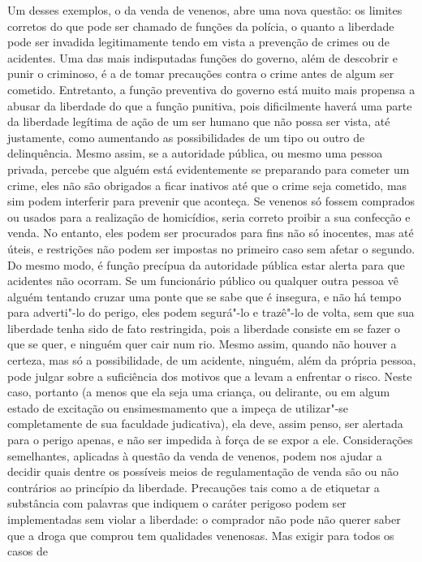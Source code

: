  Um desses exemplos, o da venda de venenos, abre uma nova questão: os
limites corretos do que pode ser chamado de funções da polícia, o
quanto a liberdade pode ser invadida legitimamente tendo em
vista a prevenção de crimes ou de acidentes. Uma das mais indisputadas
funções do governo, além de descobrir e punir o criminoso, é a de tomar
precauções contra o crime antes de algum ser cometido. Entretanto, a
função preventiva do governo está muito mais propensa a abusar da
liberdade do que a função punitiva, pois dificilmente haverá uma parte
da liberdade legítima de ação de um ser humano que não possa ser vista,
até justamente, como aumentando as possibilidades de um tipo ou outro
de delinquência. Mesmo assim, se a autoridade pública, ou mesmo uma
pessoa privada, percebe que alguém está evidentemente se preparando
para cometer um crime, eles não são obrigados a ficar inativos até que
o crime seja cometido, mas sim podem interferir para prevenir que
aconteça. Se venenos só fossem comprados ou usados para a
realização de \mbox{homicídios}, seria correto proibir a sua confecção e
venda. No entanto, eles podem ser procurados para fins não só
inocentes, mas até úteis, e restrições não podem ser impostas no
primeiro caso sem afetar o segundo. Do mesmo modo, é função precípua
da autoridade pública estar alerta para que acidentes não ocorram. Se
um funcionário público ou qualquer outra pessoa vê alguém tentando
cruzar uma ponte que se sabe que é insegura, e não há tempo para
adverti"-lo do perigo, eles podem segurá"-lo e trazê"-lo de volta,
sem que sua liberdade tenha sido de fato restringida, pois a liberdade
consiste em se fazer o que se quer, e ninguém quer cair num rio. Mesmo
assim, quando não houver a certeza, mas só a possibilidade, de um
acidente, ninguém, além da própria pessoa, pode julgar sobre a
suficiência dos motivos que a levam a enfrentar o risco. Neste caso,
portanto (a menos que ela seja uma criança, ou delirante, ou em algum
estado de excitação ou ensimesmamento que a impeça de utilizar"-se
completamente de sua faculdade judicativa), ela deve, assim penso, ser
alertada para o perigo apenas, e não ser impedida à força de se expor a
ele. Considerações semelhantes, aplicadas à questão da venda de
venenos, podem nos ajudar a decidir quais dentre os possíveis meios de
regulamentação de venda são ou não contrários ao princípio da
liberdade. Precauções tais como a de etiquetar a substância com
palavras que indiquem o caráter perigoso podem ser implementadas sem
violar a liberdade: o comprador não pode não querer saber que a droga
que comprou tem qualidades venenosas. Mas exigir para todos os casos de
